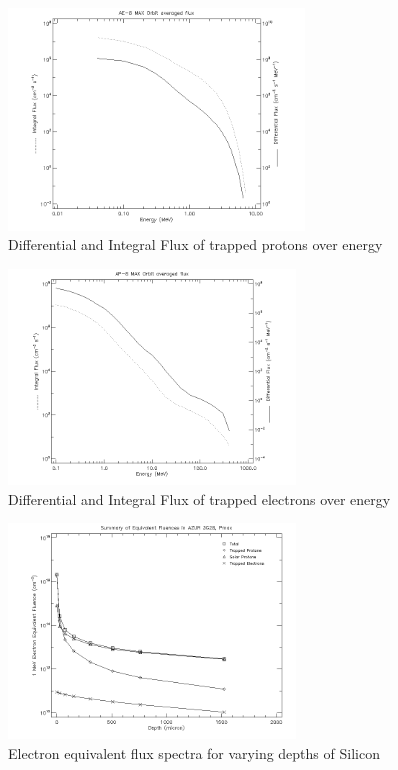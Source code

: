 \begin{figure}[H]
\centering
\includegraphics[width=0.7\textwidth]{figures/fluxElectrons.png}
\caption{Differential and Integral Flux of trapped protons over energy}
\label{FluxE}
\end{figure}

\begin{figure}[H]
\centering
\includegraphics[width=0.68\textwidth]{figures/fluxProtons.png}
\caption{Differential and Integral Flux of trapped electrons over energy}
\label{FluxP}
\end{figure}

\begin{figure}[H]
\centering
\includegraphics[width=0.68\textwidth]{figures/eqfluxsp.png}
\caption{Electron equivalent flux spectra for varying depths of Silicon}
\label{eqflux}
\end{figure}



